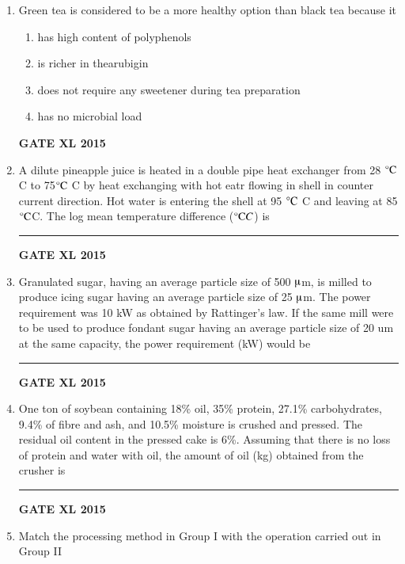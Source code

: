 \documentclass[journal,12pt,onecolumn]{IEEEtran}
\begin{document}
\begin{enumerate}
\begin{minipage}{0.5\textwidth}
\begin{flushleft}
(3) Capsanthin

(4) Lutein
	\end{flushleft}
	\end{minipage}
    \begin{enumerate}
            \item P-3,Q-2,R-2,S-1
            \item P-3,Q-1,R-3,S-4
            \item P-4,Q-3,R-2,S-1
            \item P-1,Q-2,R-4,S-3
    \end{enumerate}
\item  Green tea is considered to be a more healthy option than black tea because it
    \begin{enumerate}
            \item  has high content of polyphenols
	    \item is richer in thearubigin
	    \item {does not require any sweetener during tea preparation}
	    \item {has no microbial load}
    \end{enumerate}
\begin{flushright}\textbf{GATE XL 2015}\end{flushright}
\item  A dilute pineapple juice is heated in a double pipe heat exchanger from 28 $\celsius$ C to 75$\celsius$ C by heat exchanging with hot eatr flowing in shell in counter current direction. Hot water is entering the shell at 95 $\celsius$ C and leaving at 85 $\celsius$C. The log mean temperature difference ($\celsius C$) is \rule{1cm}{0.15mm}
\begin{flushright}\textbf{GATE XL 2015}\end{flushright}
\item  Granulated sugar, having an average particle size of 500 $\micro$m, is milled to produce icing sugar having an average particle size of 25 $\micro$m. The power requirement was 10 kW as obtained by Rattinger's law. If the same mill were to be used to produce fondant sugar having an average particle size of 20 um at the same capacity, the power requirement (kW) would be \rule{1cm}{0.15mm}
    
\begin{flushright}\textbf{GATE XL 2015}\end{flushright}

\item One ton of soybean containing 18\% oil, 35\% protein, 27.1\% carbohydrates, 9.4\% of fibre and ash, and 10.5\% moisture is crushed and pressed. The residual oil content in the pressed cake is 6\%. Assuming that there is no loss of protein and water with oil, the amount of oil (kg) obtained from the crusher is \rule{1cm}{0.15mm}
\begin{flushright}\textbf{GATE XL 2015}\end{flushright}
\item  Match the processing method in Group I with the operation carried out in Group II


\end{enumerate}
\end{document}

